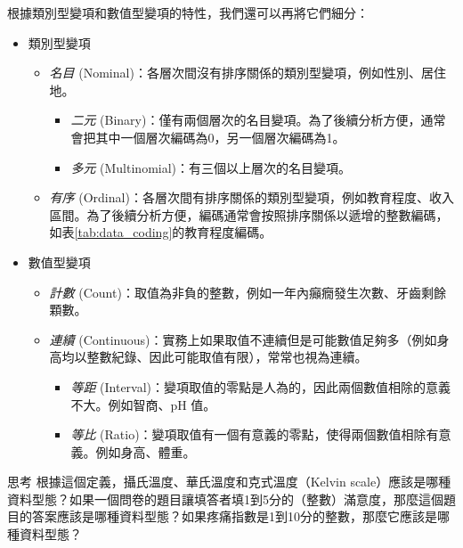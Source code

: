     \vspace{-0.5cm}

    根據類別型變項和數值型變項的特性，我們還可以再將它們細分：

    \begin{itemize}
        \item 類別型變項
        \begin{itemize}
            \item \textit{名目} (Nominal)：各層次間沒有排序關係的類別型變項，例如性別、居住地。
            \begin{itemize}
                \item \textit{二元} (Binary)：僅有兩個層次的名目變項。為了後續分析方便，通常會把其中一個層次編碼為0，另一個層次編碼為1。
                \item \textit{多元} (Multinomial)：有三個以上層次的名目變項。
            \end{itemize}
            \item \textit{有序} (Ordinal)：各層次間有排序關係的類別型變項，例如教育程度、收入區間。為了後續分析方便，編碼通常會按照排序關係以遞增的整數編碼，如表\ref{tab:data_coding}的教育程度編碼。
        \end{itemize}
        \item 數值型變項
        \begin{itemize}
            \item \textit{計數} (Count)：取值為非負的整數，例如一年內癲癇發生次數、牙齒剩餘顆數。
            \item \textit{連續} (Continuous)：實務上如果取值不連續但是可能數值足夠多（例如身高均以整數紀錄、因此可能取值有限），常常也視為連續。
            \begin{itemize}
                \item \textit{等距} (Interval)：變項取值的零點是人為的，因此兩個數值相除的意義不大。例如智商、pH 值。
                \item \textit{等比} (Ratio)：變項取值有一個有意義的零點，使得兩個數值相除有意義。例如身高、體重。
            \end{itemize}
        \end{itemize}
    \end{itemize}

    \begin{custom}{思考}
        根據這個定義，攝氏溫度、華氏溫度和克式溫度（Kelvin scale）應該是哪種資料型態？如果一個問卷的題目讓填答者填1到5分的（整數）滿意度，那麼這個題目的答案應該是哪種資料型態？如果疼痛指數是1到10分的整數，那麼它應該是哪種資料型態？
    \end{custom}

